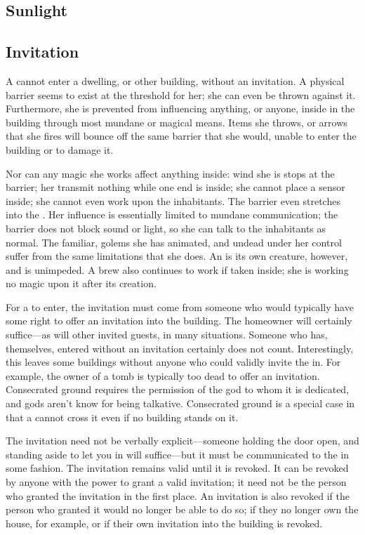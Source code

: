 \subsection{Sunlight}



\subsection{Invitation}

A {\vampire} cannot enter a dwelling, or other building, without an invitation.
A physical barrier seems to exist at the threshold for her; she can even be thrown against it.
Furthermore, she is prevented from influencing anything, or anyone, inside in the building through most mundane or magical means.
Items she throws, or arrows that she fires will bounce off the same barrier that she would, unable to enter the building or to damage it.

Nor can any magic she works affect anything inside: wind she is  stops at the barrier; her {\symlinks} transmit nothing while one end is inside; she cannot place a  sensor inside; she cannot even work  upon the inhabitants.
The barrier even stretches into the {\mentalrealm}.
Her influence is essentially limited to mundane communication; the barrier does not block sound or light, so she can talk to the inhabitants as normal.
The {\vampirepossessive} familiar, golems she has animated, and undead under her control suffer from the same limitations that she does.
An  is its own creature, however, and is unimpeded.
A {\vampirepossessive} brew also continues to work if taken inside; she is working no magic upon it after its creation.

For a {\vampire} to enter, the invitation must come from someone who would typically have some right to offer an invitation into the building.
The homeowner will certainly suffice---as will other invited guests, in many situations.
Someone who has, themselves, entered without an invitation certainly does not count.
Interestingly, this leaves some buildings without anyone who could validly invite the {\vampire} in.
For example, the owner of a tomb is typically too dead to offer an invitation.
Consecrated ground requires the permission of the god to whom it is dedicated, and gods aren't know for being talkative.
Consecrated ground is a special case in that a {\vampire} cannot cross it even if no building stands on it.

The invitation need not be verbally explicit---someone holding the door open, and standing aside to let you in will suffice---but it must be communicated to the {\vampire} in some fashion.
The invitation remains valid until it is revoked.
It can be revoked by anyone with the power to grant a valid invitation; it need not be the person who granted the invitation in the first place.
An invitation is also revoked if the person who granted it would no longer be able to do so; if they no longer own the house, for example, or if their own invitation into the building is revoked.

